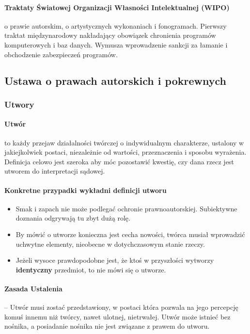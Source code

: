 \documentclass{article}
\begin{document}
\paragraph{Traktaty Światowej Organizacji Własności Intelektualnej (WIPO)}
o prawie autorskim, o artystycznych wykonaniach i fonogramach.
Pierwszy traktat międzynarodowy nakładający obowiązek chronienia programów komputerowych i baz danych.
Wymusza wprowadzenie sankcji za łamanie i obchodzenie zabezpieczeń programów.

\subsection{Ustawa o prawach autorskich i pokrewnych}

\subsubsection{Utwory}

\paragraph{Utwór} to każdy przejaw działalności twórczej o indywidualnym charakterze, ustalony w jakiejkolwiek postaci,
niezależnie od wartości, przeznaczenia i sposobu wyrażenia.
Definicja celowo jest szeroka aby móc pozostawić kwestię, czy dana rzecz jest utworem do interpretacji sądowej.

\paragraph{Konkretne przypadki wykładni definicji utworu}
\begin{itemize}
  \item Smak i zapach nie może podlegać ochronie prawnoautorskiej. Subiektywne doznania odgrywają tu zbyt dużą rolę.
  \item By mówić o utworze konieczna jest cecha nowości, twórca musiał wprowadzić uchwytne elementy, nieobecne w dotychczasowym stanie rzeczy.
  \item Jeżeli wysoce prawdopodobne jest, że ktoś w przyszłości wytworzy \textbf{identyczny} przedmiot, to nie mówi się o utworze.
\end{itemize}

\paragraph{Zasada Ustalenia}
-- Utwór musi zostać przedstawiony, w postaci która pozwala na jego percepcję komuś innemu niż twórcy, nawet ulotnej, nietrwałej.
Utwór może istnieć bez nośnika, a posiadanie nośnika nie jest związane z prawem do utworu.
\end{document}
